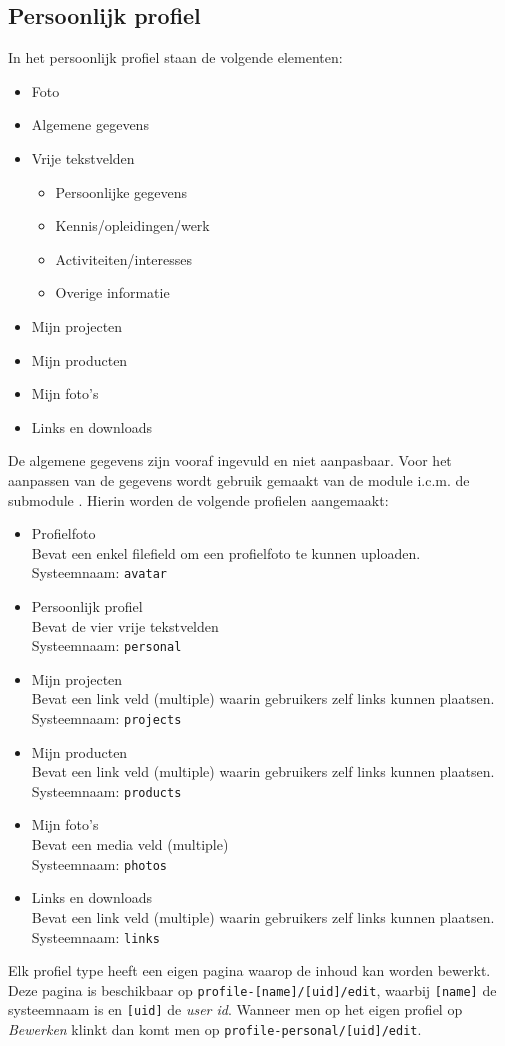 \subsection{Persoonlijk profiel}\label{profiel}

In het persoonlijk profiel staan de volgende elementen:
\begin{itemize}
\item Foto
\item Algemene gegevens
\item Vrije tekstvelden
\begin{itemize}
\item Persoonlijke gegevens
\item Kennis/opleidingen/werk
\item Activiteiten/interesses
\item Overige informatie
\end{itemize}
\item Mijn projecten
\item Mijn producten
\item Mijn foto's
\item Links en downloads
\end{itemize}
De algemene gegevens zijn vooraf ingevuld en niet aanpasbaar.
Voor het aanpassen van de gegevens wordt gebruik gemaakt van de  module i.c.m. de submodule . Hierin worden de volgende profielen aangemaakt:
\begin{itemize}
\item Profielfoto \\ Bevat een enkel filefield om een profielfoto te kunnen uploaden.
\\ Systeemnaam: \texttt{avatar}
\item Persoonlijk profiel \\ Bevat de vier vrije tekstvelden
\\ Systeemnaam: \texttt{personal}
\item Mijn projecten \\ Bevat een link veld (multiple) waarin gebruikers zelf links kunnen plaatsen.
\\ Systeemnaam: \texttt{projects}
\item Mijn producten \\ Bevat een link veld (multiple) waarin gebruikers zelf links kunnen plaatsen.
\\ Systeemnaam: \texttt{products}
\item Mijn foto's \\ Bevat een media veld (multiple)
\\ Systeemnaam: \texttt{photos}
\item Links en downloads \\ Bevat een link veld (multiple) waarin gebruikers zelf links kunnen plaatsen.
\\ Systeemnaam: \texttt{links}
\end{itemize}
Elk profiel type heeft een eigen pagina waarop de inhoud kan worden bewerkt. Deze pagina is beschikbaar op \texttt{profile-[name]/[uid]/edit}, waarbij \texttt{[name]} de systeemnaam is en \texttt{[uid]} de \emph{user id}. Wanneer men op het eigen profiel op \emph{Bewerken} klinkt dan komt men op \texttt{profile-personal/[uid]/edit}.

